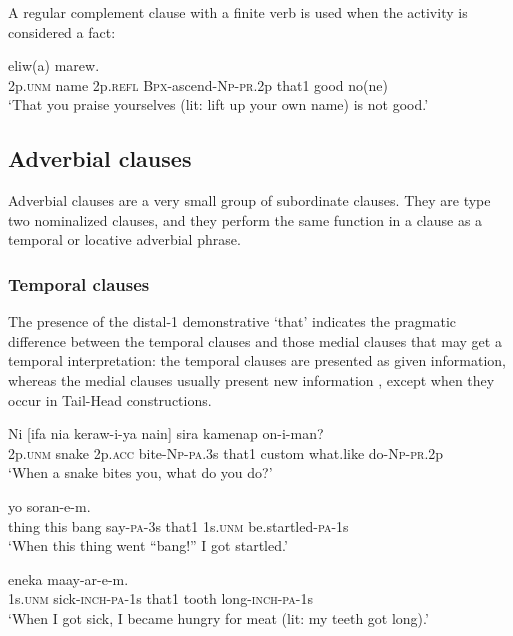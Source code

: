 A regular complement clause with a finite verb is used when the activity is considered a fact:

\ea%
\label{ex:8:x1639}
  eliw(a) marew.\\
2p.\textsc{unm} name 2p.\textsc{refl} \textsc{Bpx}-ascend-\textsc{Np}-\textsc{pr}.2p that1 good no(ne)\\
\glt`That you praise yourselves (lit: lift up your own name) is not good.'
\z


\subsection{Adverbial clauses} \label{sec:8.3.3}

Adverbial clauses are a very small group of subordinate clauses. They are type two nominalized clauses, and they perform the same function in a clause as a temporal or locative adverbial phrase. 

\subsubsection{Temporal clauses}  \label{sec:8.3.3.1}

The presence of the distal-1 demonstrative  `that' indicates the pragmatic difference between the temporal clauses and those medial clauses that may get a temporal interpretation: the temporal clauses are presented as given information, whereas the medial clauses usually present new information , except when they occur in Tail-Head constructions.

\ea%
\label{ex:8:x1540}
\gll Ni  [ifa  nia  keraw-i-ya  nain]  sira  kamenap on-i-man?\\
2p.\textsc{unm} snake 2p.\textsc{acc} bite-\textsc{Np}-\textsc{pa}.3s  that1 custom  what.like do-\textsc{Np}-\textsc{pr}.2p\\
\glt`When a snake bites you, what do you do?'
\z


\ea%
\label{ex:8:x1569}
  yo  soran-e-m.\\
thing  this  bang  say-\textsc{pa}-3s  that1  1s.\textsc{unm}  be.startled-\textsc{pa}-1s\\
\glt`When this thing went ``bang!'' I got startled.'
\z


\ea%
\label{ex:8:x1624}
  eneka  maay-ar-e-m. \\
1s.\textsc{unm} sick-\textsc{inch}-\textsc{pa}-1s that1 tooth long-\textsc{inch}-\textsc{pa}-1s\\
\glt`When I got sick, I became hungry for meat (lit: my teeth got long).'
\z


